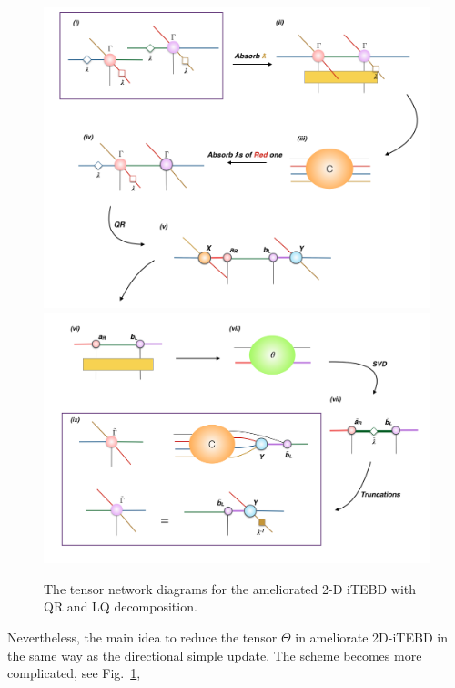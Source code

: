 \begin{figure}[!ht]
	\centering
	\includegraphics[width=1.00\textwidth]{figures/fig319.png}
	\includegraphics[width=1.00\textwidth]{figures/fig320.png}
	\caption[The tensor network diagrams for the ameliorated 2-D iTEBD with QR and LQ decomposition]{The tensor network diagrams for the ameliorated 2-D iTEBD with QR and LQ decomposition.}
	\label{fig320}
\end{figure}

Nevertheless, the main idea to reduce the tensor $\Theta$ in ameliorate 2D-iTEBD in the same way as the directional simple update. The scheme becomes more complicated, see Fig.~\ref{fig320}, 

